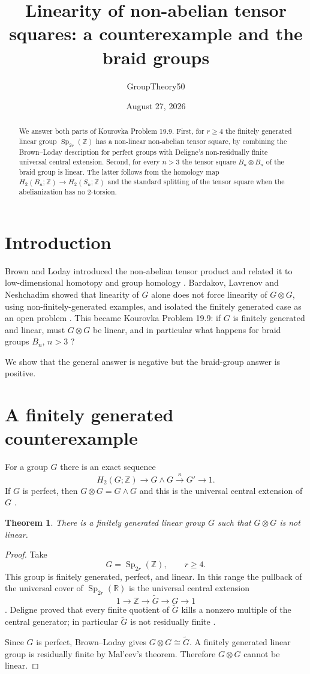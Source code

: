 \documentclass[11pt]{amsart}
\title{Linearity of non-abelian tensor squares: a counterexample and the braid groups}
\author{GroupTheory50}
\date{August 27, 2026}
\newtheorem{theorem}{Theorem}[section]
\theoremstyle{definition}
\newcommand{\Z}{\mathbb Z}
\newcommand{\R}{\mathbb R}
\begin{document}
\begin{abstract}
We answer both parts of Kourovka Problem 19.9.  First, for $r\geq4$ the finitely generated linear group $\operatorname{Sp}_{2r}(\mathbb Z)$ has a non-linear non-abelian tensor square, by combining the Brown--Loday description for perfect groups with Deligne's non-residually finite universal central extension.  Second, for every $n>3$ the tensor square $B_n\otimes B_n$ of the braid group is linear.  The latter follows from the homology map $H_2(B_n;\mathbb Z)\to H_2(S_n;\mathbb Z)$ and the standard splitting of the tensor square when the abelianization has no $2$-torsion.
\end{abstract}
\maketitle

\section{Introduction}
Brown and Loday introduced the non-abelian tensor product and related it to low-dimensional homotopy and group homology \cite{brownloday}.  Bardakov, Lavrenov and Neshchadim showed that linearity of $G$ alone does not force linearity of $G\otimes G$, using non-finitely-generated examples, and isolated the finitely generated case as an open problem \cite{bln}.  This became Kourovka Problem 19.9: if $G$ is finitely generated and linear, must $G\otimes G$ be linear, and in particular what happens for braid groups $B_n$, $n>3$ \cite{kourovka}?

We show that the general answer is negative but the braid-group answer is positive.

\section{A finitely generated counterexample}
For a group $G$ there is an exact sequence
\[
 H_2(G;\Z)\longrightarrow G\wedge G\xrightarrow{\kappa}G'\longrightarrow1.
\]
If $G$ is perfect, then $G\otimes G=G\wedge G$ and this is the universal central extension of $G$ \cite{brownloday}.

\begin{theorem}\label{thm:negative}
There is a finitely generated linear group $G$ such that $G\otimes G$ is not linear.
\end{theorem}
\begin{proof}
Take
\[
 G=\operatorname{Sp}_{2r}(\Z),\qquad r\geq4.
\]
This group is finitely generated, perfect, and linear.  In this range the pullback of the universal cover of $\operatorname{Sp}_{2r}(\R)$ is the universal central extension
\[
 1\longrightarrow\Z\longrightarrow\widetilde G\longrightarrow G\longrightarrow1
\]
\cite{benson}.  Deligne proved that every finite quotient of $\widetilde G$ kills a nonzero multiple of the central generator; in particular $\widetilde G$ is not residually finite \cite{deligne}.

Since $G$ is perfect, Brown--Loday gives $G\otimes G\cong\widetilde G$.  A finitely generated linear group is residually finite by Mal'cev's theorem.  Therefore $G\otimes G$ cannot be linear.
\end{proof}
\end{document}
